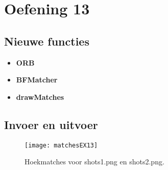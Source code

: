 \documentclass{article}
\begin{document}
	\section*{Oefening 13}
	\subsection*{Nieuwe functies}
	\begin{itemize}		
		\item \textbf{ORB}
		\item \textbf{BFMatcher}
		\item \textbf{drawMatches}
	\end{itemize}
	\subsection*{Invoer en uitvoer}
	\begin{figure}[!htb]
			\centering
			\texttt{[image: matchesEX13]}
			\caption{Hoekmatches voor shots1.png en shots2.png.}
	\end{figure}

	
\end{document}
